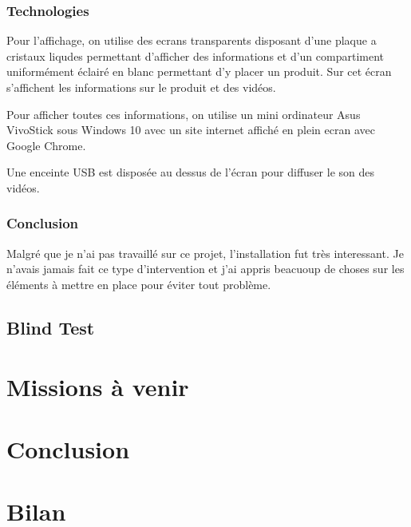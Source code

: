 \documentclass{article}
\begin{document}
\subsubsection{Technologies}

Pour l'affichage, on utilise des ecrans transparents disposant d'une plaque a cristaux liqudes permettant d'afficher des informations et d'un compartiment uniformément éclairé en blanc permettant d'y placer un produit.
Sur cet écran s'affichent les informations sur le produit et des vidéos.

Pour afficher toutes ces informations, on utilise un mini ordinateur Asus VivoStick sous Windows 10 avec un site internet affiché en plein ecran avec Google Chrome.

Une enceinte USB est disposée au dessus de l'écran pour diffuser le son des vidéos.

\subsubsection{Conclusion}

Malgré que je n'ai pas travaillé sur ce projet, l'installation fut très interessant.
Je n'avais jamais fait ce type d'intervention et j'ai appris beacuoup de choses sur les éléments à mettre en place pour éviter tout problème.

\subsection{Blind Test}

\section{Missions à venir}

\section{Conclusion}

\section{Bilan}
\end{document}
